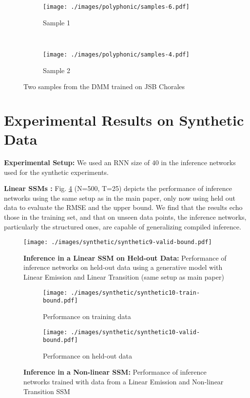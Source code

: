 \documentclass[letterpaper]{article}
\theoremstyle{plain}
\newcommand{\DKF}{DMM\xspace}
\begin{document}
{\begin{figure}[h]
	\centering
\begin{subfigure}[b]{0.23\textwidth}
	\texttt{[image: ./images/polyphonic/samples-6.pdf]}
	\caption{Sample 1}
	\label{fig:jsb-s1}
\end{subfigure}~
\begin{subfigure}[b]{0.23\textwidth}
	\texttt{[image: ./images/polyphonic/samples-4.pdf]}
	\caption{Sample 2}
	\label{fig:jsb-s2}
\end{subfigure}
\caption{Two samples from the \DKF trained on JSB Chorales}
\label{fig:poly_samples}
\end{figure} 

\newpage
\section{Experimental Results on Synthetic Data}

\textbf{Experimental Setup: } We used an RNN size of $40$ in the inference networks used for the synthetic experiments. 

\textbf{Linear SSMs :} Fig. \ref{fig:synthetic9-valid} (N=500, T=25) depicts the performance of inference networks using the same setup as in the main paper, only now using held out data to evaluate the RMSE and the upper bound. 
We find that the results echo those in the training set, and that on unseen data points, 
the inference networks, particularly the structured ones, are capable of generalizing compiled inference. 
\begin{figure}[h]
	\texttt{[image: ./images/synthetic/synthetic9-valid-bound.pdf]}
	\caption{\textbf{Inference in a Linear SSM on Held-out Data: } Performance of inference networks on held-out data using a generative model with Linear Emission and Linear Transition (same setup as main paper)}
	\label{fig:synthetic9-valid}
\end{figure}

\begin{figure}[h]
	\centering
\begin{subfigure}[b]{0.45\textwidth}
	\texttt{[image: ./images/synthetic/synthetic10-train-bound.pdf]}
	\caption{Performance on training data}
	\label{fig:synthetic10-train}
\end{subfigure}
\begin{subfigure}[b]{0.45\textwidth}
	\texttt{[image: ./images/synthetic/synthetic10-valid-bound.pdf]}
	\caption{Performance on held-out data}
	\label{fig:synthetic10-valid}
\end{subfigure}
\caption{\textbf{Inference in a Non-linear SSM: } Performance of inference networks trained with data from a Linear Emission and Non-linear Transition SSM}
\label{fig:synth-non-linear}
\end{figure} 

}
\end{document}

